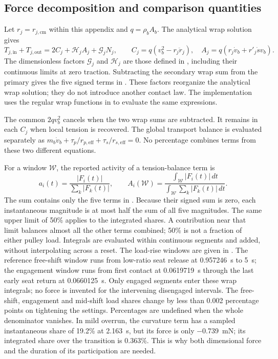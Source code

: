 \documentclass[11pt]{report}
\numberwithin{equation}{section}
\begin{document}
\subsection{Force decomposition and comparison quantities}

Let \(r_j=r_{j,\mathrm{cm}}\) within this appendix and
\(q=\rho_bA_b\). The analytical wrap solution gives
\begin{equation}
 T_{j,\mathrm{in}}+T_{j,\mathrm{out}}=2C_j+\mathcal H_jA_j+\mathcal G_jN_j,
 \qquad
 C_j=q(v_b^2-r_j\ddot r_j),\quad
 A_j=q(r_j\dot v_b+r'_j\dot s v_b).
 \label{eq:belt_publication_wrap_sum}
\end{equation}
The dimensionless factors \(\mathcal G_j\) and \(\mathcal H_j\) are
those defined in , including their
continuous limits at zero traction. Subtracting the secondary wrap sum
from the primary gives the five signed terms in
. These factors
reorganize the analytical wrap solution; they do not introduce another
contact law. The implementation uses the regular wrap functions in
 to evaluate the same expressions.

The common \(2qv_b^2\) cancels when the two wrap sums are subtracted.
It remains in each \(C_j\) when local tension is recovered. The global
transport balance is evaluated separately as
\(m_b\dot v_b+\tau_p/r_{p,\mathrm{eff}}+\tau_s/r_{s,\mathrm{eff}}=0\).
No percentage combines terms from these two different equations.

For a window \(\mathcal W\), the reported activity of a tension-balance
term is
\begin{equation}
 a_i(t)=\frac{|F_i(t)|}{\sum_k|F_k(t)|},\qquad
 A_i(\mathcal W)=\frac{\int_{\mathcal W}|F_i(t)|\,dt}
 {\int_{\mathcal W}\sum_k|F_k(t)|\,dt}.
 \label{eq:results_belt_activity}
\end{equation}
The sum contains only the five terms in .
Because their signed sum is zero, each instantaneous magnitude is at most
half the sum of all five magnitudes. The same upper limit of 50\% applies
to the integrated shares. A contribution near that limit balances almost
all the other terms combined; 50\% is not a fraction of either pulley load.
Integrals are evaluated within continuous segments and added, without
interpolating across a reset. The load-rise windows are given in
. The reference free-shift window runs
from low-ratio seat release at \SI{0.957246}{s} to \SI{5}{s}; the
engagement window runs from first contact at \SI{0.0619719}{s} through the
last early seat return at \SI{0.0660125}{s}. Only engaged segments enter
these wrap integrals; no force is invented for the intervening disengaged
intervals. The free-shift, engagement and mid-shift load shares change by
less than 0.002 percentage points on tightening the settings. Percentages are undefined when the whole
denominator vanishes. In mild overrun, the curvature term has a sampled
instantaneous share of 19.2\% at \SI{2.163}{s}, but its force is only
\SI{-0.739}{mN}; its integrated share over the transition is 0.363\%.
This is why both dimensional force and the duration of its participation
are needed.
\end{document}

